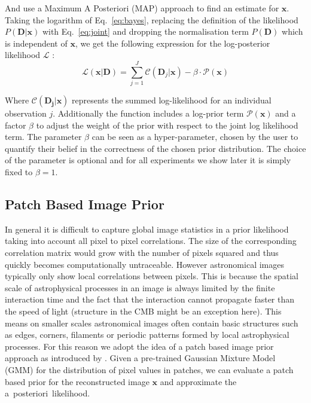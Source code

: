 \documentclass[twocolumn]{aastex631}
\newcommand{\aposteriori}{a~posteriori~}
\begin{document}
    And use a Maximum A Posteriori (MAP) approach to find an estimate for $\mathbf{x}$. Taking the logarithm of Eq.~\ref{eq:bayes}, replacing the definition of the likelihood $P(\mathbf{D}|\mathbf{x})$ with Eq.~\ref{eq:joint} and dropping the normalisation term $P(\mathbf{D})$ which is independent of $\mathbf{x}$, we get the following expression for the log-posterior likelihood $\mathcal{L}$ :
    \begin{equation}
        \label{eq:total}
        \mathcal{L}\left(\mathbf{x} | \mathbf{D} \right) = \sum_{j=1}^J \mathcal{C}\left( \mathbf{D}_j | \mathbf{x} \right) - \beta \cdot \mathcal{P}(\mathbf{x})
    \end{equation}

    Where $\mathcal{C}\left( \mathbf{D_j} | \mathbf{x} \right)$ represents the summed log-likelihood for an individual observation $j$. Additionally the function includes a log-prior term $\mathcal{P}(\mathbf{x})$ and a factor $\beta$ to adjust the weight of the prior with respect to the joint log likelihood term. The parameter $\beta$ can be seen as a hyper-parameter, chosen by the user to quantify their belief in the correctness of the chosen prior distribution. The choice of the parameter is optional and for all experiments we show later it is simply fixed to $\beta=1$. 

    \subsection{Patch Based Image Prior}
    In general it is difficult to capture global image statistics in a prior likelihood taking into account all pixel to pixel correlations. The size of the corresponding correlation matrix would grow with the number of pixels squared and thus quickly becomes computationally untraceable. However astronomical images typically only show local correlations between pixels. This is because the spatial scale of astrophysical processes in an image is always limited by the finite interaction time and the fact that the interaction cannot propagate faster than the speed of light (structure in the CMB might be an exception here). This means on smaller scales astronomical images often contain basic structures such as edges, corners, filaments or periodic patterns formed by local astrophysical processes. For this reason we adopt the idea of a patch based image prior approach as introduced by \cite{Zoran2011}. Given a pre-trained Gaussian Mixture Model (GMM) for the distribution of pixel values in patches, we can evaluate a patch based prior for the reconstructed image $\mathbf{x}$ and approximate the \aposteriori likelihood.
    
\end{document}
